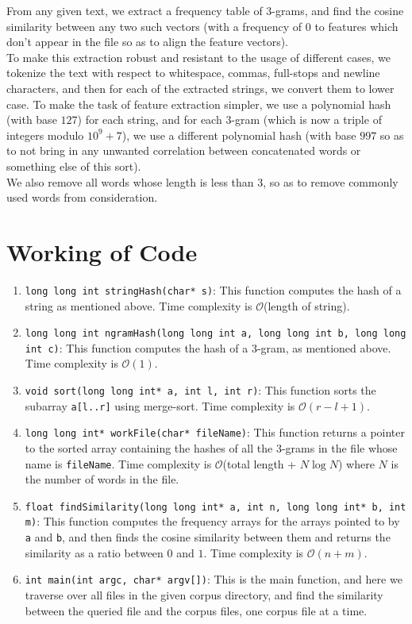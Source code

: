 \documentclass{article}
\begin{document}
From any given text, we extract a frequency table of $3$-grams, and find the cosine similarity between any two such vectors (with a frequency of 0 to features which don't appear in the file so as to align the feature vectors).\\
To make this extraction robust and resistant to the usage of different cases, we tokenize the text with respect to whitespace, commas, full-stops and newline characters, and then for each of the extracted strings, we convert them to lower case.
To make the task of feature extraction simpler, we use a polynomial hash (with base $127$) for each string, and for each $3$-gram (which is now a triple of integers modulo $10^9 + 7$), we use a different polynomial hash (with base $997$ so as to not bring in any unwanted correlation between concatenated words or something else of this sort).\\
We also remove all words whose length is less than 3, so as to remove commonly used words from consideration.

\section*{Working of Code}

\begin{enumerate}
    \item \texttt{long long int stringHash(char* s)}: This function computes the hash of a string as mentioned above. Time complexity is $\mathcal{O}$(length of string).
    \item \texttt{long long int ngramHash(long long int a, long long int b, long long int c)}: This function computes the hash of a $3$-gram, as mentioned above. Time complexity is $\mathcal{O}(1)$.
    \item \texttt{void sort(long long int* a, int l, int r)}: This function sorts the subarray \texttt{a[l..r]} using merge-sort. Time complexity is $\mathcal{O}(r - l + 1)$.
    \item \texttt{long long int* workFile(char* fileName)}: This function returns a pointer to the sorted array containing the hashes of all the $3$-grams in the file whose name is \texttt{fileName}. Time complexity is $\mathcal{O}$(total length + $N \log N$) where $N$ is the number of words in the file.
    \item \texttt{float findSimilarity(long long int* a, int n, long long int* b, int m)}: This function computes the frequency arrays for the arrays pointed to by \texttt{a} and \texttt{b}, and then finds the cosine similarity between them and returns the similarity as a ratio between $0$ and $1$. Time complexity is $\mathcal{O}(n + m)$.
    \item \texttt{int main(int argc, char* argv[])}: This is the main function, and here we traverse over all files in the given corpus directory, and find the similarity between the queried file and the corpus files, one corpus file at a time. 
\end{enumerate}
\end{document}
